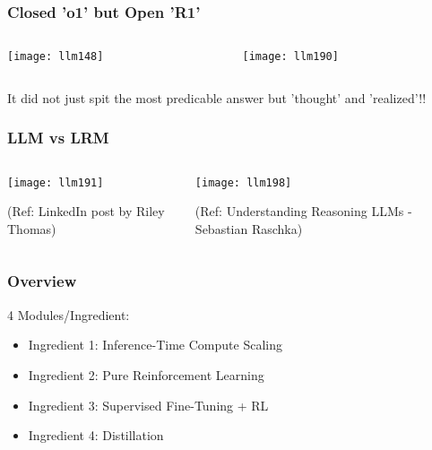 \begin{frame}[fragile]\frametitle{Closed 'o1' but Open 'R1'}

\begin{columns}
    \begin{column}[T]{0.5\linewidth}
		\begin{center}
		\texttt{[image: llm148]}		
		\end{center}
    \end{column}
    \begin{column}[T]{0.5\linewidth}	
		\begin{center}
		\texttt{[image: llm190]}
		\end{center}	
    \end{column}
  \end{columns}


It did not just spit the most predicable answer but 'thought' and 'realized'!!
\end{frame}

\begin{frame}[fragile]\frametitle{LLM vs LRM}

\begin{columns}
    \begin{column}[T]{0.5\linewidth}
		\begin{center}
		\texttt{[image: llm191]}
		
		{\tiny (Ref: LinkedIn post by Riley Thomas)}

		\end{center}	
    \end{column}
    \begin{column}[T]{0.5\linewidth}	
			\begin{center}
		\texttt{[image: llm198]}
		
		{\tiny (Ref: Understanding Reasoning LLMs - Sebastian Raschka)}
	
		\end{center}	
    \end{column}
  \end{columns}


\end{frame}

\begin{frame}[fragile]\frametitle{Overview }

4 Modules/Ingredient: 

		\begin{itemize}
		  \item Ingredient 1: Inference-Time Compute Scaling
		  \item Ingredient 2: Pure Reinforcement Learning
		  \item Ingredient 3: Supervised Fine-Tuning + RL
		  \item Ingredient 4: Distillation
		\end{itemize}
\end{frame}

